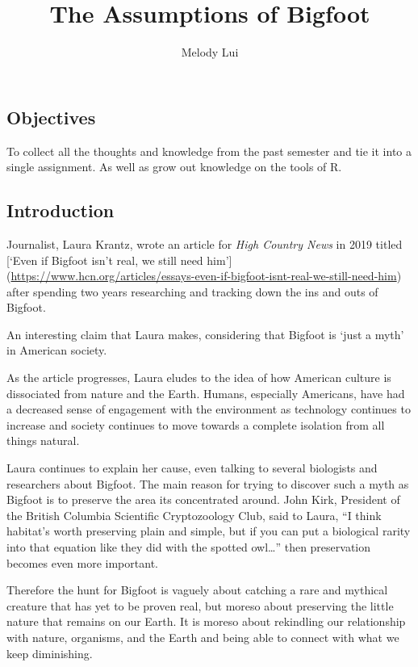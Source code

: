 \documentclass[
]{article}
\title{The Assumptions of Bigfoot}
\author{Melody Lui}
\date{}
\begin{document}
\maketitle

\hypertarget{objectives}{%
\subsection{Objectives}\label{objectives}}

To collect all the thoughts and knowledge from the past semester and tie
it into a single assignment. As well as grow out knowledge on the tools
of R.

\hypertarget{introduction}{%
\subsection{Introduction}\label{introduction}}

Journalist, Laura Krantz, wrote an article for \emph{High Country News}
in 2019 titled {[}`Even if Bigfoot isn't real, we still need him'{]}
(\url{https://www.hcn.org/articles/essays-even-if-bigfoot-isnt-real-we-still-need-him})
after spending two years researching and tracking down the ins and outs
of Bigfoot.

An interesting claim that Laura makes, considering that Bigfoot is `just
a myth' in American society.

As the article progresses, Laura eludes to the idea of how American
culture is dissociated from nature and the Earth. Humans, especially
Americans, have had a decreased sense of engagement with the environment
as technology continues to increase and society continues to move
towards a complete isolation from all things natural.

Laura continues to explain her cause, even talking to several biologists
and researchers about Bigfoot. The main reason for trying to discover
such a myth as Bigfoot is to preserve the area its concentrated around.
John Kirk, President of the British Columbia Scientific Cryptozoology
Club, said to Laura, ``I think habitat's worth preserving plain and
simple, but if you can put a biological rarity into that equation like
they did with the spotted owl\ldots{}'' then preservation becomes even
more important.

Therefore the hunt for Bigfoot is vaguely about catching a rare and
mythical creature that has yet to be proven real, but moreso about
preserving the little nature that remains on our Earth. It is moreso
about rekindling our relationship with nature, organisms, and the Earth
and being able to connect with what we keep diminishing.
\end{document}
